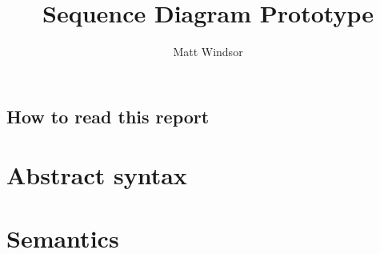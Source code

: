 \documentclass[a4paper,11pt]{report}
\title{\langname{} Sequence Diagram Prototype}
\author{Matt Windsor}
\theoremstyle{definition}
\begin{document}
\maketitle

\tableofcontents{}

\section*{How to read this report}


\chapter{Abstract syntax}


\chapter{Semantics}

\end{document}
